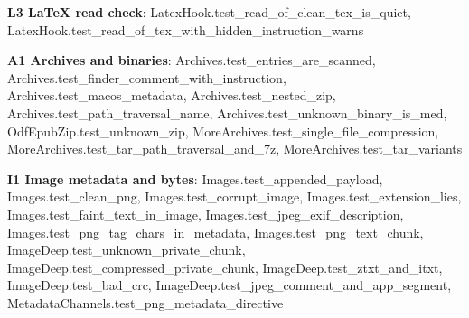 \documentclass[10pt,a4paper]{article}
\begin{document}
\textbf{L3 LaTeX read check}: \textcolor{ok}{LatexHook.\allowbreak{}test\_\allowbreak{}read\_\allowbreak{}of\_\allowbreak{}clean\_\allowbreak{}tex\_\allowbreak{}is\_\allowbreak{}quiet}, \textcolor{ok}{LatexHook.\allowbreak{}test\_\allowbreak{}read\_\allowbreak{}of\_\allowbreak{}tex\_\allowbreak{}with\_\allowbreak{}hidden\_\allowbreak{}instruction\_\allowbreak{}warns}\par
\textbf{A1 Archives and binaries}: \textcolor{ok}{Archives.\allowbreak{}test\_\allowbreak{}entries\_\allowbreak{}are\_\allowbreak{}scanned}, \textcolor{ok}{Archives.\allowbreak{}test\_\allowbreak{}finder\_\allowbreak{}comment\_\allowbreak{}with\_\allowbreak{}instruction}, \textcolor{ok}{Archives.\allowbreak{}test\_\allowbreak{}macos\_\allowbreak{}metadata}, \textcolor{ok}{Archives.\allowbreak{}test\_\allowbreak{}nested\_\allowbreak{}zip}, \textcolor{ok}{Archives.\allowbreak{}test\_\allowbreak{}path\_\allowbreak{}traversal\_\allowbreak{}name}, \textcolor{ok}{Archives.\allowbreak{}test\_\allowbreak{}unknown\_\allowbreak{}binary\_\allowbreak{}is\_\allowbreak{}med}, \textcolor{ok}{OdfEpubZip.\allowbreak{}test\_\allowbreak{}unknown\_\allowbreak{}zip}, \textcolor{ok}{MoreArchives.\allowbreak{}test\_\allowbreak{}single\_\allowbreak{}file\_\allowbreak{}compression}, \textcolor{ok}{MoreArchives.\allowbreak{}test\_\allowbreak{}tar\_\allowbreak{}path\_\allowbreak{}traversal\_\allowbreak{}and\_\allowbreak{}7z}, \textcolor{ok}{MoreArchives.\allowbreak{}test\_\allowbreak{}tar\_\allowbreak{}variants}\par
\textbf{I1 Image metadata and bytes}: \textcolor{ok}{Images.\allowbreak{}test\_\allowbreak{}appended\_\allowbreak{}payload}, \textcolor{ok}{Images.\allowbreak{}test\_\allowbreak{}clean\_\allowbreak{}png}, \textcolor{ok}{Images.\allowbreak{}test\_\allowbreak{}corrupt\_\allowbreak{}image}, \textcolor{ok}{Images.\allowbreak{}test\_\allowbreak{}extension\_\allowbreak{}lies}, \textcolor{ok}{Images.\allowbreak{}test\_\allowbreak{}faint\_\allowbreak{}text\_\allowbreak{}in\_\allowbreak{}image}, \textcolor{ok}{Images.\allowbreak{}test\_\allowbreak{}jpeg\_\allowbreak{}exif\_\allowbreak{}description}, \textcolor{ok}{Images.\allowbreak{}test\_\allowbreak{}png\_\allowbreak{}tag\_\allowbreak{}chars\_\allowbreak{}in\_\allowbreak{}metadata}, \textcolor{ok}{Images.\allowbreak{}test\_\allowbreak{}png\_\allowbreak{}text\_\allowbreak{}chunk}, \textcolor{ok}{ImageDeep.\allowbreak{}test\_\allowbreak{}unknown\_\allowbreak{}private\_\allowbreak{}chunk}, \textcolor{ok}{ImageDeep.\allowbreak{}test\_\allowbreak{}compressed\_\allowbreak{}private\_\allowbreak{}chunk}, \textcolor{ok}{ImageDeep.\allowbreak{}test\_\allowbreak{}ztxt\_\allowbreak{}and\_\allowbreak{}itxt}, \textcolor{ok}{ImageDeep.\allowbreak{}test\_\allowbreak{}bad\_\allowbreak{}crc}, \textcolor{ok}{ImageDeep.\allowbreak{}test\_\allowbreak{}jpeg\_\allowbreak{}comment\_\allowbreak{}and\_\allowbreak{}app\_\allowbreak{}segment}, \textcolor{ok}{MetadataChannels.\allowbreak{}test\_\allowbreak{}png\_\allowbreak{}metadata\_\allowbreak{}directive}\par
\end{document}
